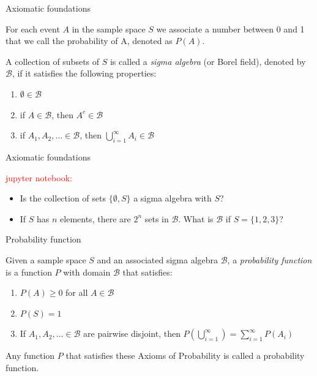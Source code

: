 \documentclass{beamer}
\begin{document}
\begin{frame}{Axiomatic foundations}

	For each event $A$ in the sample space $S$ we associate a number between 0 and 1 that we call the 
	probability of A, denoted as $P(A)$. 

	\begin{block}{}
		A collection of subsets of $S$ is called a \textit{sigma algebra} (or Borel field), denoted 
		by $\mathcal{B}$, if it satisfies the following properties:
		\begin{enumerate}
			\item $\emptyset \in \mathcal{B}$
			\item if $A \in \mathcal{B}$, then $A^c \in \mathcal{B}$ 
			\item if $A_1, A_2, ... \in \mathcal{B}$, then $\bigcup_{i=1}^\infty A_i \in \mathcal{B}$
		\end{enumerate}
	\end{block}

\end{frame}

\begin{frame}{Axiomatic foundations}

	\textcolor{red}{jupyter notebook:}
	\begin{itemize}
		\item Is the collection of sets $\{\emptyset, S\}$ a sigma algebra with $S$?
		\item If $S$ has $n$ elements, there are $2^n$ sets in $\mathcal{B}$. What is $\mathcal{B}$ if $S=\{1,2,3\}$?
	\end{itemize}

\end{frame}

\begin{frame}{Probability function}

	\begin{block}{}
		Given a sample space $S$ and an associated sigma algebra $\mathcal{B}$, a \textit{probability function} is 
		a function $P$ with domain $\mathcal{B}$ that satisfies:
		\begin{enumerate}
			\item $P(A) \geq 0$ for all $A \in \mathcal{B}$
			\item $P(S)=1$
			\item If $A_1, A_2, ... \in \mathcal{B}$ are pairwise disjoint, then $P(\bigcup_{i=1}^\infty)=\sum_{i=1}^\infty P(A_i)$
		\end{enumerate}
	\end{block}
	Any function $P$ that satisfies these Axioms of Probability is called a probability function.

\end{frame}
\end{document}

